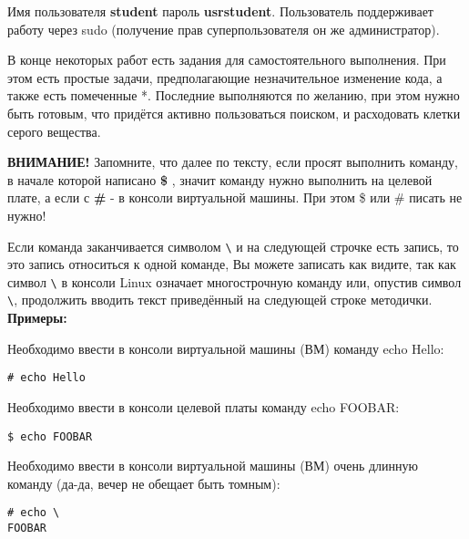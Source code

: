 Имя пользователя \textbf{student} пароль \textbf{usrstudent}. Пользователь поддерживает работу через sudo (получение прав суперпользователя он же администратор).

В конце некоторых работ есть задания для самостоятельного выполнения. При этом есть простые задачи, предполагающие незначительное изменение кода, а также есть помеченные *. Последние выполняются по желанию, при этом нужно быть готовым, что придётся активно пользоваться поиском, и расходовать клетки серого вещества.

\textbf{ВНИМАНИЕ!} Запомните, что далее по тексту, если просят выполнить команду, в начале которой написано \textbf{\$} , значит команду нужно выполнить на целевой плате, а если с \textbf{\#} - в консоли виртуальной машины. При этом \$ или \# писать не нужно! 

Если команда заканчивается символом \verb!\! и на следующей строчке есть запись, то это запись относиться к одной команде, Вы можете записать как видите, так как символ \verb!\! в консоли Linux означает многострочную команду или, опустив символ \verb!\!, продолжить вводить текст приведённый на следующей строке методички.\\

\textbf{Примеры:}

Необходимо ввести в консоли виртуальной машины (ВМ) команду echo Hello:

\begin{lstlisting}[style=bash]
# echo Hello 
\end{lstlisting}

Необходимо ввести в консоли целевой платы команду echo FOOBAR:

\begin{lstlisting}[style=bash]
$ echo FOOBAR
\end{lstlisting}

Необходимо ввести в консоли виртуальной машины (ВМ) очень длинную команду (да-да, вечер не обещает быть томным):

\begin{lstlisting}[style=bash]
# echo \
FOOBAR 
\end{lstlisting}